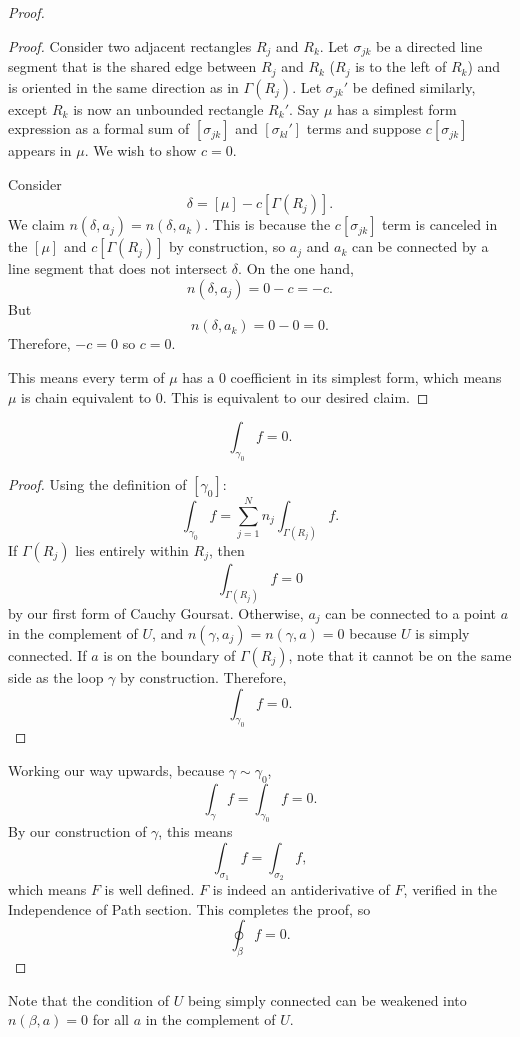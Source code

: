 \begin{proof}
\begin{proof}
        Consider two adjacent rectangles $R_j$ and $R_k$.
        Let $\sigma_{jk}$ be a directed line segment 
        that is the shared edge between $R_j$ and $R_k$
        ($R_j$ is to the left of $R_k$) and
        is oriented in the same direction as in $\Gamma(R_j)$.
        Let $\sigma_{jk}'$ be defined similarly, except
        $R_k$ is now an unbounded rectangle $R_k'$.
        Say $\mu$ has a simplest form expression as a formal
        sum of $[\sigma_{jk}]$ and $[\sigma_{kl}']$ terms and
        suppose $c[\sigma_{jk}]$ appears in $\mu$.
        We wish to show $c=0$.
        
        Consider
        \[ \delta = [\mu] - c[\Gamma(R_j)]. \]
        We claim $n(\delta, a_j) = n(\delta, a_k)$.
        This is because the $c[\sigma_{jk}]$ term is canceled
        in the $[\mu]$ and $c[\Gamma(R_j)]$ by construction,
        so $a_j$ and $a_k$ can be connected by a line segment
        that does not intersect $\delta$.
        On the one hand, 
        \[ n(\delta, a_j) = 0 - c = -c. \]
        But
        \[ n(\delta, a_k) = 0 - 0 = 0. \]
        Therefore, $-c = 0$ so $c = 0$.

        This means every term of $\mu$ has a $0$ coefficient
        in its simplest form, which means $\mu$ is chain 
        equivalent to $0$.
        This is equivalent to our desired claim.
    \end{proof}
    \begin{claim*}
        \[ \int_{\gamma_0} f = 0. \]
    \end{claim*}
    \begin{proof}
        Using the definition of $[\gamma_0]$:
        \[ \int_{\gamma_0} f = \sum_{j=1}^N n_j \int_{\Gamma(R_j)}
        f. \]
        If $\Gamma(R_j)$ lies entirely within $R_j$, then
        \[ \int_{\Gamma(R_j)} f = 0 \]
        by our first form of Cauchy Goursat.
        Otherwise, $a_j$ can be connected to a point $a$
        in the complement of $U$, and $n(\gamma, a_j) = n(\gamma
        , a) = 0$ because $U$ is simply connected.
        If $a$ is on the boundary of $\Gamma(R_j)$, note that
        it cannot be on the same side as the loop $\gamma$
        by construction.
        Therefore,
        \[ \int_{\gamma_0} f = 0. \]
    \end{proof}
    Working our way upwards, because $\gamma \sim \gamma_0$,
    \[ \int_{\gamma} f = \int_{\gamma_0} f = 0. \]
    By our construction of $\gamma$, this means
    \[ \int_{\sigma_1} f = \int_{\sigma_2} f, \]
    which means $F$ is well defined.
    $F$ is indeed an antiderivative of $F$, verified
    in the Independence of Path section.
    This completes the proof, so
    \[ \oint_{\beta} f = 0. \]
\end{proof}

Note that the condition of $U$ being simply connected can
be weakened into $n(\beta, a) = 0$ for all $a$ in the complement
of $U$.

